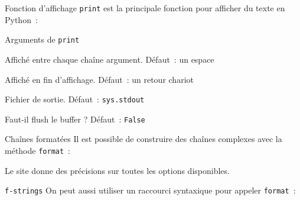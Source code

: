 \begin{frame}{Fonction d'affichage}
  \texttt{print} est la principale fonction pour afficher du texte en Python~:

\end{frame}

\begin{frame}{Arguments de \texttt{print}}
  \begin{description}[<+->]
    \item[\texttt{sep}] Affiché entre chaque chaîne argument. Défaut~: un espace
    \item[\texttt{end}] Affiché en fin d'affichage. Défaut~: un retour chariot
    \item[\texttt{file}] Fichier de sortie. Défaut~: \texttt{sys.stdout}
    \item[\texttt{flush}] Faut-il flush le buffer ? Défaut~: \texttt{False}
  \end{description}

\end{frame}

\begin{frame}{Chaînes formatées}
  Il est possible de construire des chaînes complexes avec la méthode \texttt{format}~:


  Le site  donne des précisions sur toutes les options disponibles.  
\end{frame}

\begin{frame}{\texttt{f-strings}}
  On peut aussi utiliser un raccourci syntaxique pour appeler \texttt{format}~:

\end{frame}